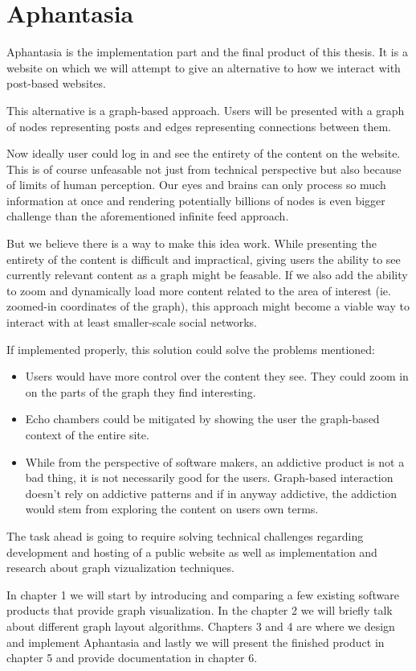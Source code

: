 \section*{Aphantasia}
Aphantasia is the implementation part and the final product of this thesis.
It is a website on which we will attempt to give an alternative to how we interact with post-based websites.

This alternative is a graph-based approach.
Users will be presented with a graph of nodes representing posts and edges representing connections between them.

Now ideally user could log in and see the entirety of the content on the website.
This is of course unfeasable not just from technical perspective but also because of limits of human perception.
Our eyes and brains can only process so much information at once
and rendering potentially billions of nodes is even bigger challenge than the aforementioned infinite feed approach.

But we believe there is a way to make this idea work.
While presenting the entirety of the content is difficult and impractical,
giving users the ability to see currently relevant content as a graph might be feasable.
If we also add the ability to zoom and dynamically load more content related to the area of interest (ie. zoomed-in coordinates of the graph),
this approach might become a viable way to interact with at least smaller-scale social networks.

If implemented properly, this solution could solve the problems mentioned:
\begin{itemize}
  \item Users would have more control over the content they see. They could zoom in on the parts of the graph they find interesting.
  \item Echo chambers could be mitigated by showing the user the graph-based context of the entire site.
  \item While from the perspective of software makers, an addictive product is not a bad thing, it is not necessarily good for the users.
    Graph-based interaction doesn't rely on addictive patterns and if in anyway addictive,
    the addiction would stem from exploring the content on users own terms.
\end{itemize}


The task ahead is going to require solving technical challenges regarding development and hosting of a public website
as well as implementation and research about graph vizualization techniques.

In chapter 1 we will start by introducing and comparing a few existing software products that provide graph visualization.
In the chapter 2 we will briefly talk about different graph layout algorithms.
Chapters 3 and 4 are where we design and implement Aphantasia
and lastly we will present the finished product in chapter 5 and provide documentation in chapter 6.